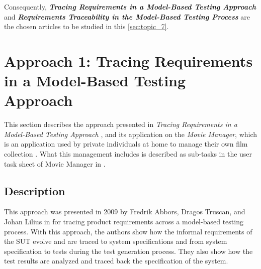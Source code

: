 Consequently, \textbf{\textit{Tracing Requirements in a Model-Based Testing Approach}} \cite{Paper1} and \textbf{\textit{Requirements Traceability in the Model-Based Testing Process}}  \cite{Paper2} are the chosen articles to be studied in this \autoref{sec:topic_7}.


\section{Approach 1: Tracing Requirements in a Model-Based Testing Approach}
\label{sec:AP1}

This section describes the approach presented in \textit{Tracing Requirements in a Model-Based Testing Approach} \cite{Paper1}, and its application on the \textit{Movie Manager}, which is an application used by private individuals at home to manage their own film collection \cite{MovieManager}. What this management includes is described as sub-tasks in the user task sheet of Movie Manager in \cite{MovieManager}. 

\subsection{Description}
\label{subsec:DE1}
This approach was presented in 2009 by Fredrik Abbors, Dragos Truscan, and Johan Lilius in \cite{Paper1} for tracing product requirements across a model-based testing process. With this approach, the authors show how the informal requirements of the SUT evolve and are traced to system specifications and from system specification to tests during the test generation process. They also show how the test results are analyzed and traced back the specification of the system. 

